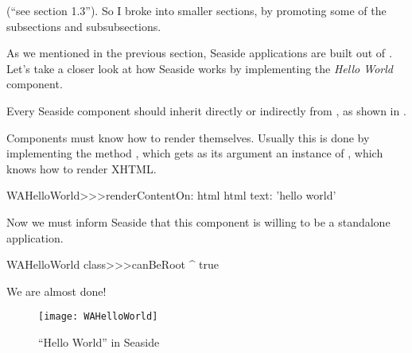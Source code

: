 \documentclass[a4paper,10pt,twoside]{book}
\begin{document}
(``see section 1.3''). So I broke into smaller sections, by promoting some of the
subsections and subsubsections.

As we mentioned in the previous section, Seaside applications are built out of
\emph{.}
Let's take a closer look at how Seaside works by implementing the \emph{Hello World}
component.

Every Seaside component should inherit directly or indirectly from ,
as shown in .


Components must know how to render themselves.
Usually this is done by implementing the method ,
which gets as its argument an instance of , which knows how to
render XHTML.

\begin{code}{}
WAHelloWorld>>>renderContentOn: html
	html text: 'hello world'
\end{code}

\noindent
Now we must inform Seaside that this component is willing to be a standalone application.

\begin{code}{}
WAHelloWorld class>>>canBeRoot
	^ true
\end{code}

\noindent
We are almost done!


\begin{figure}[htb]
\begin{center}
\texttt{[image: WAHelloWorld]}
\caption{``Hello World'' in Seaside}
\end{center}
\end{figure}

\end{document}
